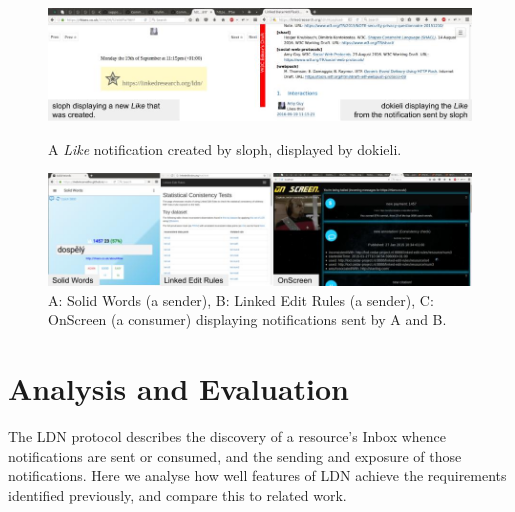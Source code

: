 \documentclass[a4paper]{llncs}
\begin{document}
\begin{figure}
  \includegraphics[width=\textwidth]{media/images/screenshot-ldn-sloph-dokieli}
  \caption{A {\em Like} notification created by sloph, displayed by dokieli.}
  \label{fig:like}

  \includegraphics[width=\textwidth]{media/images/screenshot-ldn-senders}
  \caption{A: Solid Words (a sender), B: Linked Edit Rules (a sender), C: OnScreen (a consumer) displaying notifications sent by A and B.}
  \label{fig:notifications}
\end{figure}

                                




                                





                        \section{Analysis and Evaluation}
  \label{analysis-and-evaluation}



\par The LDN protocol describes the discovery of a resource’s Inbox whence notifications are sent or consumed, and the sending and exposure of those notifications. Here we analyse how well features of LDN achieve the \empty requirements identified previously, and compare this to related work.
\end{document}
